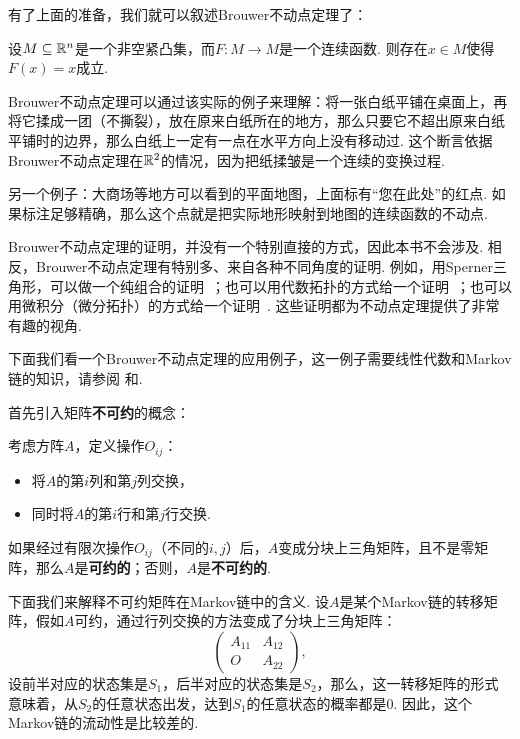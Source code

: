 有了上面的准备，我们就可以叙述Brouwer不动点定理了：

\begin{theorem}[Brouwer不动点定理]
    设$M\subseteq\mathbb{R}^n$是一个非空紧凸集，而$F:M\to M$是一个连续函数. 则存在$x\in M$使得$F(x)=x$成立.
\end{theorem}

Brouwer不动点定理可以通过该实际的例子来理解：将一张白纸平铺在桌面上，再将它揉成一团（不撕裂），放在原来白纸所在的地方，那么只要它不超出原来白纸平铺时的边界，那么白纸上一定有一点在水平方向上没有移动过. 这个断言依据Brouwer不动点定理在$\mathbb{R}^2$的情况，因为把纸揉皱是一个连续的变换过程.

另一个例子：大商场等地方可以看到的平面地图，上面标有“您在此处”的红点. 如果标注足够精确，那么这个点就是把实际地形映射到地图的连续函数的不动点.

\begin{remark}
    Brouwer不动点定理的证明，并没有一个特别直接的方式，因此本书不会涉及. 相反，Brouwer不动点定理有特别多、来自各种不同角度的证明. 例如，用Sperner三角形，可以做一个纯组合的证明~\cite{aignerTouchingSimplices2018}；也可以用代数拓扑的方式给一个证明~\cite{hatcherAlgebraicTopology2001}；也可以用微积分（微分拓扑）的方式给一个证明~\cite{milnorTopologyDifferentiableViewpoint1997}. 这些证明都为不动点定理提供了非常有趣的视角.
\end{remark}

下面我们看一个Brouwer不动点定理的应用例子，这一例子需要线性代数和Markov链的知识，请参阅 和.

首先引入矩阵\textbf{不可约}的概念：

\begin{definition}[不可约矩阵]
    考虑方阵$A$，定义操作$O_{ij}$：
    \begin{itemize}
        \item 将$A$的第$i$列和第$j$列交换，
        \item 同时将$A$的第$i$行和第$j$行交换.
    \end{itemize}

    如果经过有限次操作$O_{ij}$（不同的$i,j$）后，$A$变成分块上三角矩阵，且不是零矩阵，那么$A$是\textbf{可约的}；否则，$A$是\textbf{不可约的}.
\end{definition}

下面我们来解释不可约矩阵在Markov链中的含义. 设$A$是某个Markov链的转移矩阵，假如$A$可约，通过行列交换的方法变成了分块上三角矩阵：
\[\begin{pmatrix}
    A_{11} & A_{12}\\
    O & A_{22}
\end{pmatrix},\]
设前半对应的状态集是$S_1$，后半对应的状态集是$S_2$，那么，这一转移矩阵的形式意味着，从$S_2$的任意状态出发，达到$S_1$的任意状态的概率都是$0$. 因此，这个Markov链的流动性是比较差的. 

